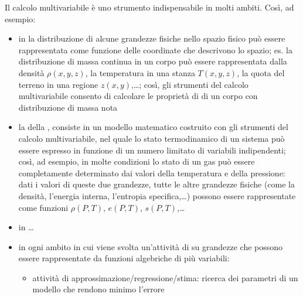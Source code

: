 \documentclass[letterpaper,10pt,italian]{jupyterBook}
\begin{document}
\sphinxAtStartPar
{} Il calcolo multivariabile è uno strumento indispensabile in molti ambiti. Così, ad esempio:
\begin{itemize}
\item {} 
\sphinxAtStartPar
in  la distribuzione di alcune grandezze fisiche nello spazio fisico può essere rappresentata come funzione delle coordinate che descrivono lo spazio; es. la distribuzione di massa continua in un corpo può essere rappresentata dalla densità \(\rho(x,y,z)\), la temperatura in una stanza \(T(x,y,z)\), la quota del terreno in una regione \(z(x,y)\),…; così, gli strumenti del calcolo multivariabile consento di calcolare le proprietà di  di un corpo con distribuzione di massa nota

\item {} 
\sphinxAtStartPar
la  della , consiste in un modello matematico costruito con gli strumenti del calcolo multivariabile, nel quale lo stato termodinamico di un sistema può essere espresso in funzione di un numero limitato di variabili indipendenti; così, ad esempio, in molte condizioni lo stato di un gas può essere completamente determinato dai valori della temperatura e della pressione: dati i valori di queste due grandezze, tutte le altre grandezze fisiche (come la densità, l’energia interna, l’entropia specifica,…) possono essere rappresentate come funzioni \(\rho(P,T)\), \(e(P,T)\), \(s(P,T)\),…

\item {} 
\sphinxAtStartPar
in   …

\item {} 
\sphinxAtStartPar
in ogni ambito in cui viene svolta un’attività di  su grandezze che possono essere rappresentate da funzioni algebriche di più variabili:
\begin{itemize}
\item {} 
\sphinxAtStartPar
attività di approssimazione/regressione/stima: ricerca dei parametri di un modello che rendono minimo l’errore


\end{itemize}
\end{itemize}
\end{document}

